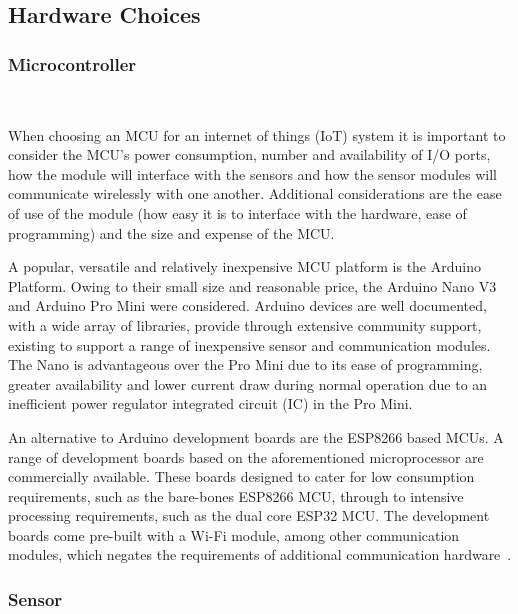 \documentclass[10pt,twocolumn]{witseiepaper}
\begin{document}
	\subsection{Hardware Choices} 
	
		\subsubsection{Microcontroller} $   $
		
			When choosing an MCU for an internet of things (IoT) system it is important to consider the MCU's power consumption, number and availability of I/O ports, how the module will interface with the sensors and how the sensor modules will communicate wirelessly with one another. Additional considerations are the ease of use of the module (how easy it is to interface with the hardware, ease of programming) and the size and expense of the MCU.
			
			A popular, versatile and relatively inexpensive MCU platform is the Arduino Platform. Owing to their small size and reasonable price, the Arduino Nano V3 and Arduino Pro Mini were considered. Arduino devices are well documented, with a wide array of libraries, provide through extensive community support, existing to support a range of inexpensive sensor and communication modules. The Nano is advantageous over the Pro Mini due to its ease of programming, greater availability and lower current draw during normal operation due to an inefficient power regulator integrated circuit (IC) in the Pro Mini.

			An alternative to Arduino development boards are the ESP8266 based MCUs. A range of development boards based on the aforementioned microprocessor are commercially available. These boards designed to cater for low consumption requirements, such as the bare-bones ESP8266 MCU, through to intensive processing requirements, such as the dual core ESP32 MCU. The development boards come pre-built with a Wi-Fi module, among other communication modules, which negates the requirements of additional communication hardware~\cite{esp12e}.
			
		\subsubsection{Sensor} $   $
			
\end{document}
